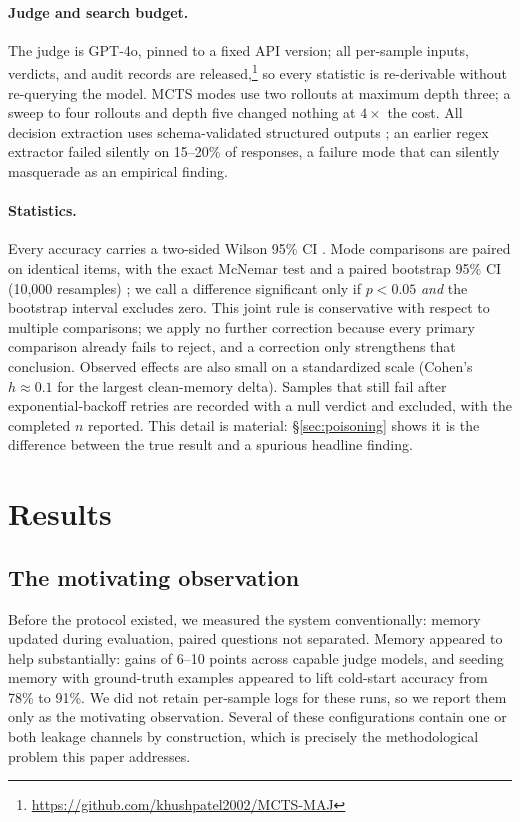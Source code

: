 \documentclass[11pt]{article}
\begin{document}
\paragraph{Judge and search budget.} The judge is GPT-4o, pinned to a fixed API version; all per-sample inputs, verdicts, and audit records are released,\footnote{\url{https://github.com/khushpatel2002/MCTS-MAJ}} so every statistic is re-derivable without re-querying the model. MCTS modes use two rollouts at maximum depth three; a sweep to four rollouts and depth five changed nothing at $4\times$ the cost. All decision extraction uses schema-validated structured outputs \citep{pydantic2024}; an earlier regex extractor failed silently on 15--20\% of responses, a failure mode that can silently masquerade as an empirical finding.

\paragraph{Statistics.} Every accuracy carries a two-sided Wilson 95\% CI \citep{wilson1927}. Mode comparisons are paired on identical items, with the exact McNemar test \citep{mcnemar1947} and a paired bootstrap 95\% CI (10{,}000 resamples) \citep{bootstrap1993}; we call a difference significant only if $p<0.05$ \emph{and} the bootstrap interval excludes zero. This joint rule is conservative with respect to multiple comparisons; we apply no further correction because every primary comparison already fails to reject, and a correction only strengthens that conclusion. Observed effects are also small on a standardized scale (Cohen's $h \approx 0.1$ for the largest clean-memory delta). Samples that still fail after exponential-backoff retries are recorded with a null verdict and excluded, with the completed $n$ reported. This detail is material: \S\ref{sec:poisoning} shows it is the difference between the true result and a spurious headline finding.

\section{Results}
\label{sec:results}

\subsection{The motivating observation}

Before the protocol existed, we measured the system conventionally: memory updated during evaluation, paired questions not separated. Memory appeared to help substantially: gains of 6--10 points across capable judge models, and seeding memory with ground-truth examples appeared to lift cold-start accuracy from 78\% to 91\%. We did not retain per-sample logs for these runs, so we report them only as the motivating observation. Several of these configurations contain one or both leakage channels by construction, which is precisely the methodological problem this paper addresses.
\end{document}
